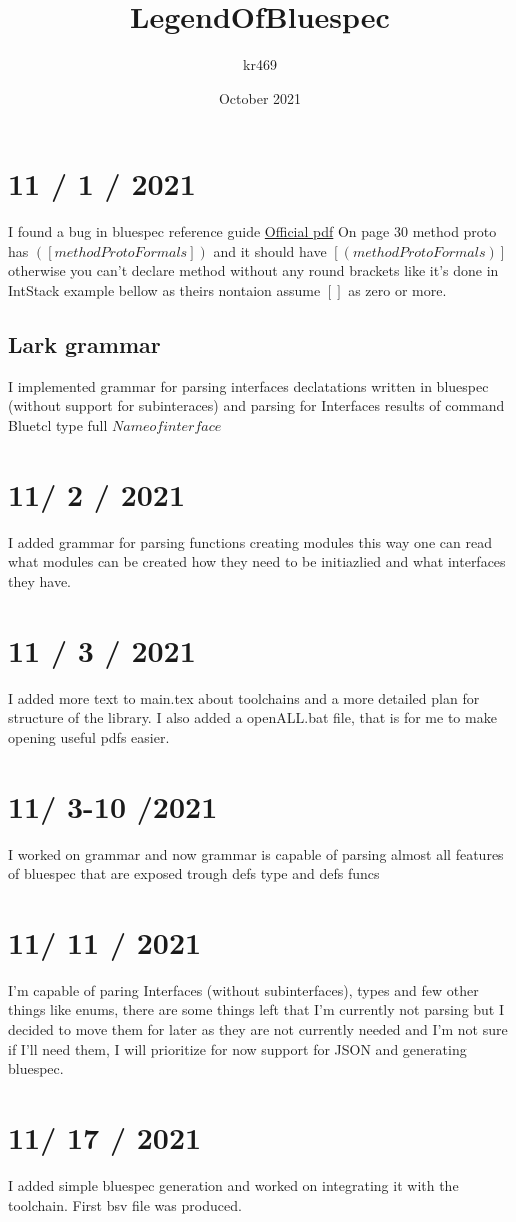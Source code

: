 \documentclass{article}
\title{LegendOfBluespec}
\author{kr469 }
\date{October 2021}
\begin{document}
\maketitle

\section{11 / 1 / 2021}
    I found a bug in bluespec reference guide
    \hyperlink{https://github.com/BSVLang/Main/blob/master/Language_Spec/bsv-reference-guide.pdf}{Official pdf}
    On page 30 method proto has $([ methodProtoFormals ])$ 
    and it should have $[( methodProtoFormals)]$ 
    otherwise you can't declare method without any round brackets like it's done in IntStack example bellow
    as theirs nontaion assume $[]$ as zero or more. 

    \subsection{Lark grammar}
         I implemented grammar for parsing interfaces declatations written in bluespec (without support for subinteraces)
         and parsing for Interfaces results of command Bluetcl type full \( Name of interface \)

\section{11/ 2 / 2021}
    I added grammar for parsing functions creating modules this way one can 
    read what modules can be created how they need to be initiazlied and what interfaces they have.  

\section{11 / 3 / 2021}
    I added more text to main.tex about toolchains and a more detailed plan for structure of the library. I also added a openALL.bat file, that is for me to make opening useful pdfs easier.

\section{11/ 3-10 /2021}
    I worked on grammar and now grammar is capable of parsing almost all features of bluespec that are exposed trough defs type and defs funcs 
\section{11/ 11 / 2021}
    I'm capable of paring Interfaces (without subinterfaces), types and few other things like enums, there are some things left that I'm currently not parsing but I decided to move them for later as they are not currently needed and I'm not sure if I'll need them, I will prioritize for now support for JSON and generating bluespec.

\section{11/ 17 / 2021}
    I added simple bluespec generation and worked on integrating it with the toolchain. First bsv file was produced.
\end{document}
